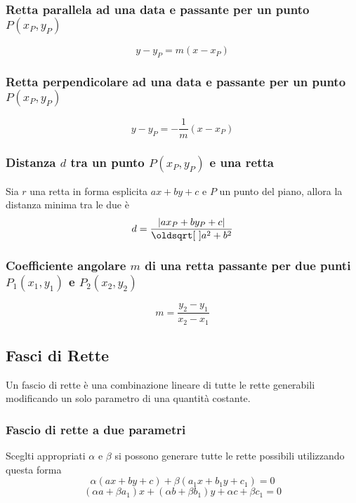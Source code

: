 \subsubsection{Retta parallela ad una data e passante per un punto $P(x_P,y_P)$}
\begin{equation*}
  y-y_P = m(x-x_P)
\end{equation*}

\subsubsection{Retta perpendicolare ad una data e passante per un punto $P(x_P,y_P)$}
\begin{equation*}
  y - y_P = -\frac{1}{m} (x - x_P)
\end{equation*}

\subsubsection{Distanza $d$ tra un punto $P(x_P,y_P)$ e una retta}
Sia $r$ una retta in forma esplicita $ax+by+c$ e $P$ un punto del piano, allora la distanza minima
tra le due è
\begin{equation*}
  d = \frac{\abs{ax_P + by_P +c}}{\sqrt{a^2+b^2}}
\end{equation*}

\subsubsection{Coefficiente angolare $m$ di una retta passante per due punti $P_1(x_1,y_1)$ e 
$P_2(x_2,y_2)$}
\begin{equation*}
  m=\frac{y_2-y_1}{x_2-x_1}
\end{equation*}

\subsection{Fasci di Rette}\label{subsec:geomanal:fasciorette}
Un fascio di rette è una combinazione lineare di tutte le rette generabili modificando un solo 
parametro di una quantità costante.

\subsubsection{Fascio di rette a due parametri}
Sceglti appropriati $\alpha$ e $\beta$ si possono generare tutte le rette possibili utilizzando questa
forma
\begin{equation*}
  \alpha(ax + by + c) + \beta(a_1x + b_1y + c_1) = 0
\end{equation*}
\begin{equation*}
  (\alpha a + \beta a_1)x + (\alpha b + \beta b_1)y + \alpha c + \beta c_1 = 0
\end{equation*}

